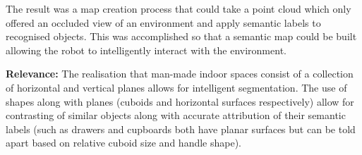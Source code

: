 The result was a map creation process that could take a point cloud which only offered an occluded view of an environment and apply semantic labels to recognised objects. This was accomplished so that a semantic map could be built allowing the robot to intelligently interact with the environment. 

\textbf{Relevance:} The realisation that man-made indoor spaces consist of a collection of horizontal and vertical planes allows for intelligent segmentation. The use of shapes along with planes (cuboids and horizontal surfaces respectively) allow for contrasting of similar objects along with accurate attribution of their semantic labels (such as drawers and cupboards both have planar surfaces but can be told apart based on relative cuboid size and handle shape). 
